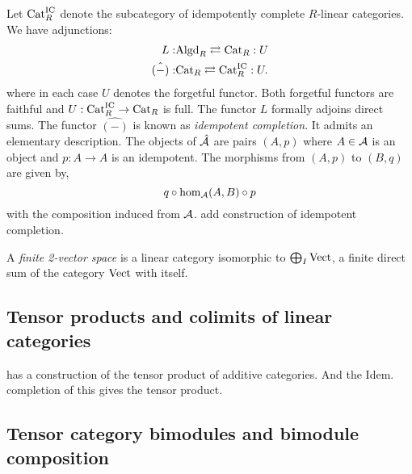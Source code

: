 \documentclass{amsart}
\begin{document}
Let $\mathrm{Cat}_R^\text{IC}$ denote the subcategory of idempotently complete $R$-linear categories. We have adjunctions:
\begin{align*}
		L:  & \mathrm{Algd}_R   \rightleftarrows \mathrm{Cat}_R : U \\
		\hat{(-)}:  & \mathrm{Cat}_R \rightleftarrows \mathrm{Cat}_R^\textrm{IC} : U. 
\end{align*}
where in each case $U$ denotes the forgetful functor. Both forgetful functors are faithful and $U: \mathrm{Cat}_R^\textrm{IC} \to \mathrm{Cat}_R$ is full. The functor $L$ formally adjoins direct sums. The functor $\hat{(-)}$ is known as {\em idempotent completion}. It admits an elementary description. The objects of $\hat {\mathcal A}$ are pairs $(A, p)$ where $A \in \mathcal A$ is an object and $p: A \to A$ is an idempotent. The morphisms from $(A, p)$ to $(B,q)$ are given by,
\begin{equation*}
	q \circ \hom_\mathcal A(A, B) \circ p
\end{equation*} 
with the composition induced from $\mathcal A$.
add construction of idempotent completion. 



\begin{definition}
	A {\em finite 2-vector space} is a linear category isomorphic to $\bigoplus_I \mathrm{Vect}$,
	 a finite direct sum of the category $\mathrm{Vect}$ with itself. 
\end{definition}

\subsection{Tensor products and colimits of linear categories}

{\color{CSPcolor}
\cite{Tambara01} has a construction of the tensor product of additive categories. And the Idem. completion of this gives the tensor product. 

}
\subsection{Tensor category bimodules and bimodule composition}
\end{document}

